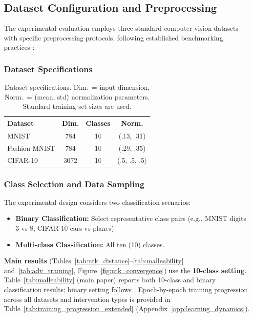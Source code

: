 \documentclass{article}
\theoremstyle{plain}
\theoremstyle{definition}
\theoremstyle{remark}
\begin{document}
\subsection{Dataset Configuration and Preprocessing}

The experimental evaluation employs three standard computer vision datasets with specific preprocessing protocols, following established benchmarking practices \citep{krizhevsky2009learning}:

\subsubsection{Dataset Specifications}
\begin{table}[h]
\caption{Dataset specifications. Dim.\ = input dimension, Norm.\ = (mean, std) normalization parameters. Standard training set sizes are used.}
\centering
\footnotesize
\begin{tabular}{@{}lccc@{}}
\toprule
\textbf{Dataset} & \textbf{Dim.} & \textbf{Classes} & \textbf{Norm.} \\
\midrule
MNIST & 784 & 10 & (.13, .31) \\
Fashion-MNIST & 784 & 10 & (.29, .35) \\
CIFAR-10 & 3072 & 10 & (.5, .5, .5) \\
\bottomrule
\end{tabular}
\end{table}

\subsubsection{Class Selection and Data Sampling}
The experimental design considers two classification scenarios:
\begin{itemize}
\item \textbf{Binary Classification:} Select representative class pairs (e.g., MNIST digits 3 vs 8, CIFAR-10 cars vs planes)
\item \textbf{Multi-class Classification:} All ten (10) classes.
\end{itemize}
\textbf{Main results} (Tables~\ref{tab:ntk_distance}--\ref{tab:malleability} and~\ref{tab:adv_training}, Figure~\ref{fig:ntk_convergence}) use the \textbf{10-class setting}. Table~\ref{tab:malleability} (main paper) reports both 10-class and binary classification results; binary setting follows \citet{zhang2022rethinking}. Epoch-by-epoch training progression across all datasets and intervention types is provided in Table~\ref{tab:training_progression_extended} (Appendix~\ref{app:learning_dynamics}).
\end{document}
